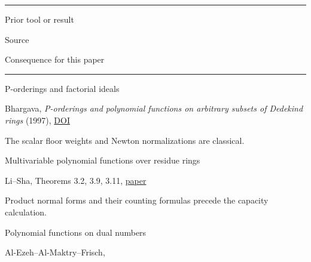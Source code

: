 \documentclass[11pt,a4paper]{article}
\newlength{\OfflineResearchTableWidth}
\newcommand{\OfflineResearchHeaderRule}{\noindent\rule{\linewidth}{0.45pt}\par}
\newcommand{\OfflineResearchRow}{\par}
\newenvironment{OfflineResearchTable}{%
  \par\medskip\begingroup\small\setlength{\parindent}{0pt}%
  \setlength{\parskip}{3pt plus 1pt minus .5pt}%
  \setlength{\OfflineResearchTableWidth}{\linewidth}%
}{%
  \par\endgroup\medskip%
}
\begin{document}
\begin{OfflineResearchTable}
\OfflineResearchHeaderRule
\noindent%
\begin{minipage}[t]{0.23625\OfflineResearchTableWidth}\raggedright
Prior tool or result
\end{minipage}\hfill%
\begin{minipage}[t]{0.34020\OfflineResearchTableWidth}\raggedright
Source
\end{minipage}\hfill%
\begin{minipage}[t]{0.36855\OfflineResearchTableWidth}\raggedright
Consequence for this paper
\end{minipage}%
\OfflineResearchRow
\nobreak
\OfflineResearchHeaderRule
\nobreak
\noindent%
\begin{minipage}[t]{0.23625\OfflineResearchTableWidth}\raggedright
P-orderings and factorial ideals
\end{minipage}\hfill%
\begin{minipage}[t]{0.34020\OfflineResearchTableWidth}\raggedright
Bhargava, \emph{P-orderings and
polynomial functions on arbitrary subsets of Dedekind rings} (1997),
\href{https://doi.org/10.1515/crll.1997.490.101}{DOI}
\end{minipage}\hfill%
\begin{minipage}[t]{0.36855\OfflineResearchTableWidth}\raggedright
The scalar floor
weights and Newton normalizations are classical.
\end{minipage}%
\OfflineResearchRow
\noindent%
\begin{minipage}[t]{0.23625\OfflineResearchTableWidth}\raggedright
Multivariable polynomial functions over residue rings
\end{minipage}\hfill%
\begin{minipage}[t]{0.34020\OfflineResearchTableWidth}\raggedright
Li--Sha,
Theorems 3.2, 3.9, 3.11, \href{https://arxiv.org/abs/1704.04965}{paper}
\end{minipage}\hfill%
\begin{minipage}[t]{0.36855\OfflineResearchTableWidth}\raggedright
Product normal forms and their counting formulas precede the capacity
calculation.
\end{minipage}%
\OfflineResearchRow
\noindent%
\begin{minipage}[t]{0.23625\OfflineResearchTableWidth}\raggedright
Polynomial functions on dual numbers
\end{minipage}\hfill%
\begin{minipage}[t]{0.34020\OfflineResearchTableWidth}\raggedright
Al-Ezeh--Al-Maktry--Frisch,

\end{minipage}
\end{OfflineResearchTable}
\end{document}
